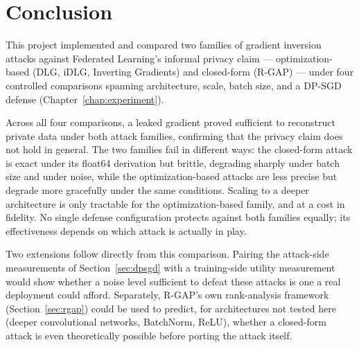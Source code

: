 \chapter{Conclusion}
\label{chap:conclusion}

This project implemented and compared two families of gradient inversion
attacks against Federated Learning's informal privacy claim --- optimization-based
(DLG, iDLG, Inverting Gradients) and closed-form (R-GAP) --- under four
controlled comparisons spanning architecture, scale, batch size, and a
DP-SGD defense (Chapter~\ref{chap:experiment}).

Across all four comparisons, a leaked gradient proved sufficient to
reconstruct private data under both attack families, confirming that the
privacy claim does not hold in general. The two families fail in
different ways: the closed-form attack is exact under its float64 derivation but brittle,
degrading sharply under batch size and under noise, while the
optimization-based attacks are less precise but degrade more
gracefully under the same conditions. Scaling to a deeper architecture is
only tractable for the optimization-based family, and at a cost in
fidelity. No single defense configuration protects against both families
equally; its effectiveness depends on which attack is actually in play.

Two extensions follow directly from this comparison. Pairing the
attack-side measurements of Section~\ref{sec:dpsgd} with a training-side
utility measurement would show whether a noise level sufficient to defeat
these attacks is one a real deployment could afford. Separately, R-GAP's
own rank-analysis framework (Section~\ref{sec:rgap}) could be used to
predict, for architectures not tested here (deeper convolutional networks,
BatchNorm, ReLU), whether a closed-form attack is even theoretically
possible before porting the attack itself.

